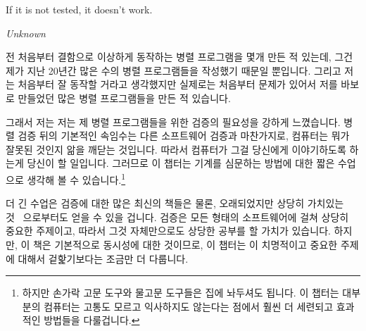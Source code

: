 

\epigraph{If it is not tested, it doesn't work.}{\emph{Unknown}}

전 처음부터 결함으로 이상하게 동작하는 병렬 프로그램을 몇개 만든 적 있는데,
그건 제가 지난 20년간 많은 수의 병렬 프로그램들을 작성했기 때문일 뿐입니다.
그리고 저는 처음부터 잘 동작할 거라고 생각했지만 실제로는 처음부터 문제가
있어서 저를 바보로 만들었던 많은 병렬 프로그램들을 만든 적 있습니다.

그래서 저는 저는 제 병렬 프로그램들을 위한 검증의 필요성을 강하게 느꼈습니다.
병렬 검증 뒤의 기본적인 속임수는 다른 소프트웨어 검증과 마찬가지로, 컴퓨터는
뭐가 잘못된 것인지 앎을 깨닫는 것입니다.
따라서 컴퓨터가 그걸 당신에게 이야기하도록 하는게 당신이 할 일입니다.
그러므로 이 챕터는 기계를 심문하는 방법에 대한 짧은 수업으로 생각해 볼 수
있습니다.\footnote{
	하지만 손가락 고문 도구와 물고문 도구들은 집에 놔두셔도 됩니다.
	이 챕터는 대부분의 컴퓨터는 고통도 모르고 익사하지도 않는다는 점에서
	훨씬 더 세련되고 효과적인 방법들을 다룰겁니다.}

더 긴 수업은 검증에 대한 많은 최신의 책들은 물론, 오래되었지만 상당히 가치있는
것~\cite{GlenfordJMyers1979} 으로부터도 얻을 수 있을 겁니다.
검증은 모든 형태의 소프트웨어에 걸쳐 상당히 중요한 주제이고, 따라서 그것
자체만으로도 상당한 공부를 할 가치가 있습니다.
하지만, 이 책은 기본적으로 동시성에 대한 것이므로, 이 챕터는 이 치명적이고
중요한 주제에 대해서 겉핥기보다는 조금만 더 다룹니다.
\iffalse

